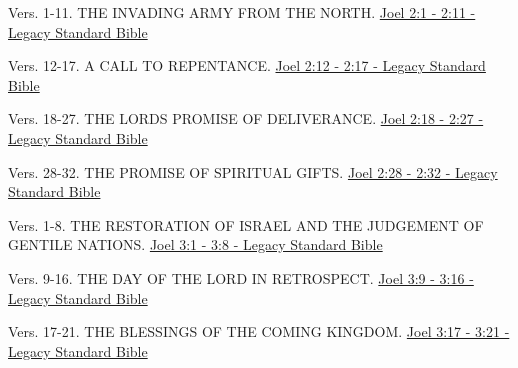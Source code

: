 \documentclass[
  ignorenonframetext,
]{beamer}
\begin{document}
\begin{frame}{2}
\label{section-120}
\begin{block}{Vers. 1-11. THE INVADING ARMY FROM THE NORTH.}
\label{vers.-1-11.-the-invading-army-from-the-north.}
\href{https://read.lsbible.org/?q=joel2\%3A1-11}{Joel 2:1 - 2:11 -
Legacy Standard Bible}
\end{block}

\begin{block}{Vers. 12-17. A CALL TO REPENTANCE.}
\label{vers.-12-17.-a-call-to-repentance.}
\href{https://read.lsbible.org/?q=joel2\%3A12-17}{Joel 2:12 - 2:17 -
Legacy Standard Bible}
\end{block}

\begin{block}{Vers. 18-27. THE LORD\textquotesingle S PROMISE OF
DELIVERANCE.}
\label{vers.-18-27.-the-lords-promise-of-deliverance.}
\href{https://read.lsbible.org/?q=joel2\%3A18-27}{Joel 2:18 - 2:27 -
Legacy Standard Bible}
\end{block}

\begin{block}{Vers. 28-32. THE PROMISE OF SPIRITUAL GIFTS.}
\label{vers.-28-32.-the-promise-of-spiritual-gifts.}
\href{https://read.lsbible.org/?q=joel2\%3A28-32}{Joel 2:28 - 2:32 -
Legacy Standard Bible}
\end{block}
\end{frame}

\begin{frame}{3}
\label{section-121}
\begin{block}{Vers. 1-8. THE RESTORATION OF ISRAEL AND THE JUDGEMENT OF
GENTILE NATIONS.}
\label{vers.-1-8.-the-restoration-of-israel-and-the-judgement-of-gentile-nations.}
\href{https://read.lsbible.org/?q=joel3\%3A1-8}{Joel 3:1 - 3:8 - Legacy
Standard Bible}
\end{block}

\begin{block}{Vers. 9-16. THE DAY OF THE LORD IN RETROSPECT.}
\label{vers.-9-16.-the-day-of-the-lord-in-retrospect.}
\href{https://read.lsbible.org/?q=joel3\%3A9-16}{Joel 3:9 - 3:16 -
Legacy Standard Bible}
\end{block}

\begin{block}{Vers. 17-21. THE BLESSINGS OF THE COMING KINGDOM.}
\label{vers.-17-21.-the-blessings-of-the-coming-kingdom.}
\href{https://read.lsbible.org/?q=joel3\%3A17-21}{Joel 3:17 - 3:21 -
Legacy Standard Bible}
\end{block}
\end{frame}
\end{document}
